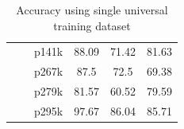 \begin{table}[h]
{\begin{tabular}{cccccc}
                            &                                                 & p141k                    & 88.09            & 71.42         & 81.63                      \\
                            &                                                 & p267k                    & 87.5             & 72.5          & 69.38                      \\
                            &                                                 & p279k                    & 81.57            & 60.52         & 79.59                      \\
                            &                                                 & p295k                    & 97.67            & 86.04         & 85.71     \\
\hline                
\end{tabular}
}
\caption{Accuracy using single universal training dataset}
\label{tab:universal}
\end{table}
